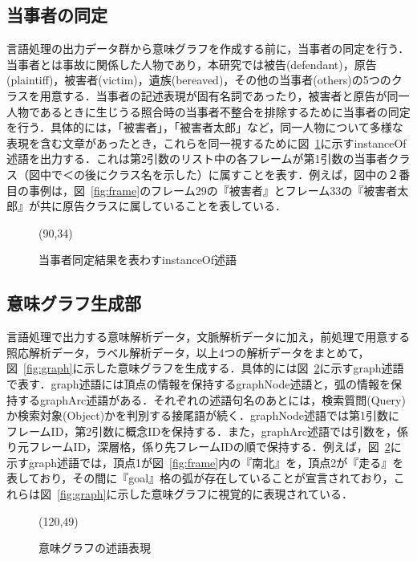 \subsection{当事者の同定}
言語処理の出力データ群から意味グラフを作成する前に，当事者の同定を行う．当事者とは事故に関係した人物であり，本研究では被告(defendant)，原告(plaintiff)，被害者(victim)，遺族(bereaved)，その他の当事者(others)の5つのクラスを用意する．当事者の記述表現が固有名詞であったり，被害者と原告が同一人物であるときに生じうる照合時の当事者不整合を排除するために当事者の同定を行う．具体的には，「被害者」，「被害者太郎」など，同一人物について多様な表現を含む文章があったとき，これらを同一視するために図~\ref{fig:instanceof}に示すinstanceOf述語を出力する．これは第2引数のリスト中の各フレームが第1引数の当事者クラス（図中で＜の後にクラス名を示した）に属すことを表す．例えば，図中の２番目の事例は，図~\ref{fig:frame}のフレーム29の『被害者』とフレーム33の『被害者太郎』が共に原告クラスに属していることを表している．

\begin{figure}
\begin{center}
 \atari(90,34)
 \caption{当事者同定結果を表わすinstanceOf述語}
 \label{fig:instanceof}
\end{center}
\end{figure}

\subsection{意味グラフ生成部}

言語処理で出力する意味解析データ，文脈解析データに加え，前処理で用意する照応解析データ，ラベル解析データ，以上4つの解析データをまとめて，図~\ref{fig:graph}に示した意味グラフを生成する．具体的には図~\ref{fig:graphdata}に示すgraph述語で表す．graph述語には頂点の情報を保持するgraphNode述語と，弧の情報を保持するgraphArc述語がある．それぞれの述語句名のあとには，検索質問(Query)か検索対象(Object)かを判別する接尾語が続く．graphNode述語では第1引数にフレームID，第2引数に概念IDを保持する．また，graphArc述語では引数を，係り元フレームID，深層格，係り先フレームIDの順で保持する．例えば，図~\ref{fig:graphdata}に示すgraph述語では，頂点1が図~\ref{fig:frame}内の『南北』を，頂点2が『走る』を表しており，その間に『goal』格の弧が存在していることが宣言されており，これらは図~\ref{fig:graph}に示した意味グラフに視覚的に表現されている．

\begin{figure}
\begin{center}
 \atari(120,49)
 \caption{意味グラフの述語表現}
 \label{fig:graphdata}
\end{center}
\end{figure}

